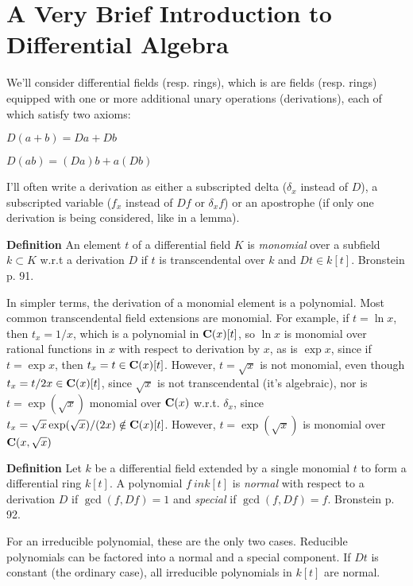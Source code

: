 \documentclass{article}
\newcommand{\C}{\ensuremath{{\bf C}}}
\begin{document}
\parindent 0pt
\parskip 12pt

\section*{A Very Brief Introduction to Differential Algebra}

We'll consider
differential fields (resp. rings), which is are fields (resp. rings)
equipped with one or more additional unary operations (derivations),
each of which satisfy two axioms:

\begin{center}
   $D(a+b) = Da+Db$

   $D(ab) = (Da)b + a(Db)$
\end{center}

I'll often write a derivation as either a subscripted delta ($\delta_x$ instead of $D$),
a subscripted variable ($f_x$ instead of $Df$ or $\delta_x f$) or an apostrophe
(if only one derivation is being considered, like in a lemma).

{\bf Definition} An element $t$ of a differential field $K$ is {\it monomial} over
a subfield $k \subset K$ w.r.t a derivation $D$ if $t$ is transcendental
over $k$ and $Dt \in k[t]$.  Bronstein p. 91.

In simpler terms, the derivation of a monomial element is a
polynomial.  Most common transcendental field extensions are monomial.
For example, if $t = \ln x$, then $t_x = 1/x$, which is a polynomial
in $\C(x)[t]$, so $\ln x$ is monomial over rational functions in $x$ with
respect to derivation by $x$, as is $\exp x$, since if $t=\exp x$,
then $t_x=t\in \C(x)[t]$.  However, $t=\sqrt x$ is not monomial, even though $t_x
= t/2x \in \C(x)[t]$, since $\sqrt x$ is not transcendental (it's
algebraic), nor is $t= \exp(\sqrt x)$ monomial over $\C(x)$ w.r.t. $\delta_x$, since
$t_x = \sqrt x \exp(\sqrt x) / (2 x) \notin \C(x)[t]$.
However, $t=\exp(\sqrt x)$ is monomial over $\C(x,\sqrt x)$


{\bf Definition} Let $k$ be a differential field extended by a single
monomial $t$ to form a differential ring $k[t]$.
A polynomial $f \ in k[t]$ is {\it normal} with respect to a
derivation $D$ if $\gcd(f,Df)=1$ and {\it special} if $\gcd(f,Df)=f$.
Bronstein p. 92.

For an irreducible polynomial, these are the only two cases.
Reducible polynomials can be factored into a normal and a special
component.  If $Dt$ is constant (the ordinary case), all irreducible
polynomials in $k[t]$ are normal.
\end{document}
